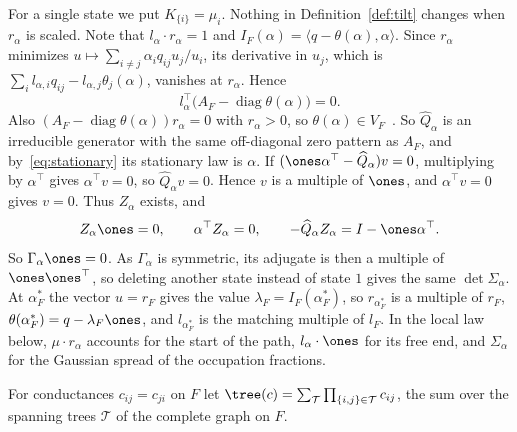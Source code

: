 For a single state we put $K_{\{i\}}=\mu_i$.
Nothing in Definition~\ref{def:tilt} changes when $r_\alpha$ is scaled. Note that
$l_\alpha\cdot r_\alpha=1$ and $I_F(\alpha)=\langle q-\theta(\alpha),\alpha\rangle$. Since
$r_\alpha$ minimizes $u\mapsto\sum_{i\ne j}\alpha_iq_{ij}u_j/u_i$, its derivative in $u_j$, which
is $\sum_il_{\alpha,i}q_{ij}-l_{\alpha,j}\theta_j(\alpha)$, vanishes at $r_\alpha$. Hence
\begin{equation}\label{eq:stationary}
l_\alpha^\top\bigl(A_F-\operatorname{diag}\theta(\alpha)\bigr)=0 .
\end{equation}
Also $(A_F-\operatorname{diag}\theta(\alpha))r_\alpha=0$ with $r_\alpha>0$, so $\theta(\alpha)\in
V_F$~\cite{bermanplemmons1994}. So $\widehat Q_\alpha$ is an irreducible generator with the
same off-diagonal zero pattern as $A_F$, and by~\eqref{eq:stationary} its stationary law is
$\alpha$. If $(\ones\alpha^\top-\widehat Q_\alpha)v=0$, multiplying by $\alpha^\top$ gives
$\alpha^\top v=0$, so $\widehat Q_\alpha v=0$. Hence $v$ is a multiple of $\ones$, and
$\alpha^\top v=0$ gives $v=0$. Thus $Z_\alpha$ exists, and
\begin{equation}\label{eq:Zprops}
Z_\alpha\ones=0,\qquad\alpha^\top Z_\alpha=0,\qquad
-\widehat Q_\alpha Z_\alpha=I-\ones\alpha^\top .
\end{equation}
So $\Gamma_\alpha\ones=0$. As $\Gamma_\alpha$ is symmetric, its adjugate is then a multiple of
$\ones\ones^\top$, so deleting another state instead of state $1$ gives the same
$\det\Sigma_\alpha$. At $\alpha^*_F$ the vector $u=r_F$ gives the value $\lambda_F=I_F(\alpha^*_F)$,
so $r_{\alpha^*_F}$ is a multiple of $r_F$, $\theta(\alpha^*_F)=q-\lambda_F\ones$, and
$l_{\alpha^*_F}$ is the matching multiple of $l_F$. In the local law below, $\mu\cdot r_\alpha$
accounts for the start of the path, $l_\alpha\cdot\ones$ for its free end, and $\Sigma_\alpha$
for the Gaussian spread of the occupation fractions.

For conductances $c_{ij}=c_{ji}$ on $F$ let
$\tree(c)=\sum_{\mathcal T}\prod_{\{i,j\}\in\mathcal T}c_{ij}$, the sum over
the spanning trees $\mathcal T$ of the complete graph on $F$.

